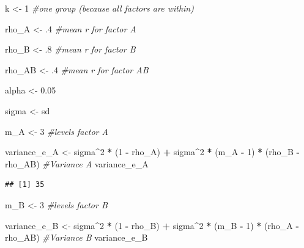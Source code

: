 \documentclass[]{book}
\newenvironment{Shaded}{\begin{snugshade}}{\end{snugshade}}
\newcommand{\CommentTok}[1]{\textcolor[rgb]{0.56,0.35,0.01}{\textit{#1}}}
\newcommand{\DecValTok}[1]{\textcolor[rgb]{0.00,0.00,0.81}{#1}}
\newcommand{\FloatTok}[1]{\textcolor[rgb]{0.00,0.00,0.81}{#1}}
\newcommand{\NormalTok}[1]{#1}
\newcommand{\OperatorTok}[1]{\textcolor[rgb]{0.81,0.36,0.00}{\textbf{#1}}}
\newcommand{\StringTok}[1]{\textcolor[rgb]{0.31,0.60,0.02}{#1}}
\begin{document}
\begin{Shaded}
\begin{Highlighting}[]
\NormalTok{k <-}\StringTok{ }\DecValTok{1} \CommentTok{#one group (because all factors are within)}

\NormalTok{rho_A <-}\StringTok{ }\FloatTok{.4} \CommentTok{#mean r for factor A}

\NormalTok{rho_B <-}\StringTok{ }\FloatTok{.8} \CommentTok{#mean r for factor B}

\NormalTok{rho_AB <-}\StringTok{ }\FloatTok{.4} \CommentTok{#mean r for factor AB}

\NormalTok{alpha <-}\StringTok{ }\FloatTok{0.05}

\NormalTok{sigma <-}\StringTok{ }\NormalTok{sd}

\NormalTok{m_A <-}\StringTok{ }\DecValTok{3} \CommentTok{#levels factor A}

\NormalTok{variance_e_A <-}\StringTok{ }\NormalTok{sigma}\OperatorTok{^}\DecValTok{2} \OperatorTok{*}\StringTok{ }\NormalTok{(}\DecValTok{1} \OperatorTok{-}\StringTok{ }\NormalTok{rho_A) }\OperatorTok{+}\StringTok{ }
\StringTok{  }\NormalTok{sigma}\OperatorTok{^}\DecValTok{2} \OperatorTok{*}\StringTok{ }\NormalTok{(m_A }\OperatorTok{-}\StringTok{ }\DecValTok{1}\NormalTok{) }\OperatorTok{*}\StringTok{ }\NormalTok{(rho_B }\OperatorTok{-}\StringTok{ }\NormalTok{rho_AB) }
\CommentTok{#Variance A}
\NormalTok{variance_e_A}
\end{Highlighting}
\end{Shaded}

\begin{verbatim}
## [1] 35
\end{verbatim}

\begin{Shaded}
\begin{Highlighting}[]
\NormalTok{m_B <-}\StringTok{ }\DecValTok{3} \CommentTok{#levels factor B}

\NormalTok{variance_e_B <-}\StringTok{ }\NormalTok{sigma}\OperatorTok{^}\DecValTok{2} \OperatorTok{*}\StringTok{ }\NormalTok{(}\DecValTok{1} \OperatorTok{-}\StringTok{ }\NormalTok{rho_B) }\OperatorTok{+}\StringTok{ }
\StringTok{  }\NormalTok{sigma}\OperatorTok{^}\DecValTok{2} \OperatorTok{*}\StringTok{ }\NormalTok{(m_B }\OperatorTok{-}\StringTok{ }\DecValTok{1}\NormalTok{) }\OperatorTok{*}\StringTok{ }\NormalTok{(rho_A }\OperatorTok{-}\StringTok{ }\NormalTok{rho_AB)}
\CommentTok{#Variance B}
\NormalTok{variance_e_B}
\end{Highlighting}
\end{Shaded}
\end{document}
